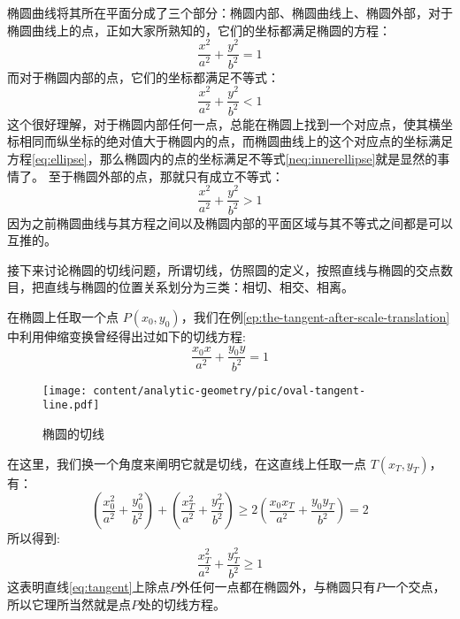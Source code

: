 椭圆曲线将其所在平面分成了三个部分：椭圆内部、椭圆曲线上、椭圆外部，对于椭圆曲线上的点，正如大家所熟知的，它们的坐标都满足椭圆的方程：
\begin{equation}
\frac{x^2}{a^2}+\frac{y^2}{b^2}=1 \label{eq:ellipse}
\end{equation}
而对于椭圆内部的点，它们的坐标都满足不等式：
\begin{equation}
\frac{x^2}{a^2}+\frac{y^2}{b^2}<1 \label{neq:innerellipse}
\end{equation}
这个很好理解，对于椭圆内部任何一点，总能在椭圆上找到一个对应点，使其横坐标相同而纵坐标的绝对值大于椭圆内的点，而椭圆曲线上的这个对应点的坐标满足方程\ref{eq:ellipse}，那么椭圆内的点的坐标满足不等式\ref{neq:innerellipse}就是显然的事情了。
至于椭圆外部的点，那就只有成立不等式：
\begin{equation}
\frac{x^2}{a^2}+\frac{y^2}{b^2}>1 \label{neq:outerellipse}
\end{equation}
因为之前椭圆曲线与其方程之间以及椭圆内部的平面区域与其不等式之间都是可以互推的。

接下来讨论椭圆的切线问题，所谓切线，仿照圆的定义，按照直线与椭圆的交点数目，把直线与椭圆的位置关系划分为三类：相切、相交、相离。

在椭圆上任取一个点 $P(x_0,y_0)$，我们在例\ref{ep:the-tangent-after-scale-translation}中利用伸缩变换曾经得出过如下的切线方程:
\begin{equation}
\frac{x_0x}{a^2}+\frac{y_0y}{b^2}=1 \label{eq:tangent}
\end{equation}
\begin{center}
\end{center}

\begin{figure}[htbp]
  \centering
\texttt{[image: content/analytic-geometry/pic/oval-tangent-line.pdf]}
\caption{椭圆的切线}
\label{fig:oval-tangent-line}
\end{figure}

在这里，我们换一个角度来阐明它就是切线，在这直线上任取一点 $T(x_T,y_T)$，有：
\begin{equation}
(\frac{x_0^2}{a^2}+\frac{y_0^2}{b^2})+(\frac{x_T^2}{a^2}+\frac{y_T^2}{b^2}) \geqslant 2(\frac{x_0x_T}{a^2}+\frac{y_0y_T}{b^2})=2
\end{equation}
所以得到:
\begin{equation}
\frac{x_T^2}{a^2}+\frac{y_T^2}{b^2} \geqslant 1
\end{equation}
这表明直线\ref{eq:tangent}上除点$P$外任何一点都在椭圆外，与椭圆只有$P$一个交点，所以它理所当然就是点$P$处的切线方程。

